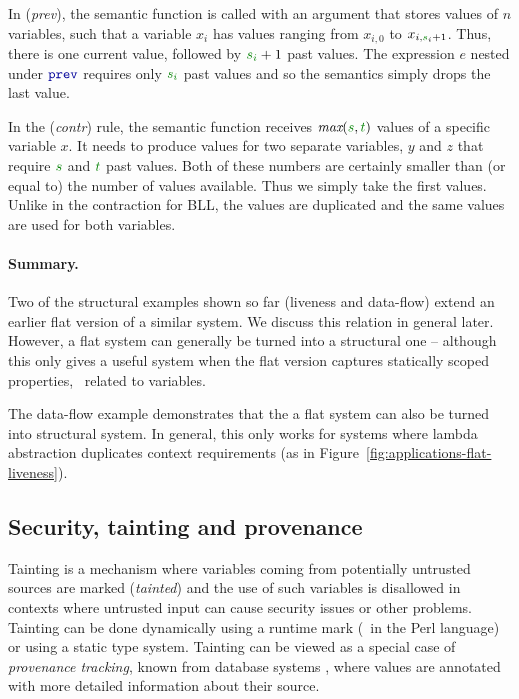 %
In (\emph{prev}), the semantic function is called with an argument that stores values of $n$
variables, such that a variable $x_i$ has values ranging from $x_{i,0}$ to $x_{i,\cclrd{s}_i + 1}$.
Thus, there is one current value, followed by $\cclrd{s_i} + 1$ past values. The expression $e$
nested under $\kvd{prev}$ requires only $\cclrd{s_i}$ past values and so the semantics simply
drops the last value.

In the (\emph{contr}) rule, the semantic function receives $\emph{max}(\cclrd{s}, \cclrd{t})$ values
of a specific variable $x$. It needs to produce values for two separate variables, $y$ and $z$ that
require $\cclrd{s}$ and $\cclrd{t}$ past values. Both of these numbers are certainly smaller than 
(or equal to) the number of values available. Thus we simply take the first values. Unlike in the
contraction for BLL, the values are duplicated and the same values are used for both variables.

\paragraph{Summary.}
Two of the structural examples shown so far (liveness and data-flow) extend an earlier flat 
version of a similar system. We discuss this relation in general later. However, a flat system 
can generally be turned into a structural one -- although this only gives a useful system when
the flat version captures statically scoped properties, \ie~related to variables.

The data-flow example demonstrates that the a flat system can also be turned into structural 
system. In general, this only works for systems where lambda abstraction duplicates context
requirements (as in Figure~\ref{fig:applications-flat-liveness}). 


\subsection{Security, tainting and provenance}
Tainting is a mechanism where variables coming from potentially untrusted sources are marked
(\emph{tainted}) and the use of such variables is disallowed in contexts where untrusted input
can cause security issues or other problems. Tainting can be done dynamically using a runtime mark
(\eg~in the Perl language) or using a static type system. Tainting can be viewed as a special
case of \emph{provenance tracking}, known from database systems \cite{app-provenance-db}, where
values are annotated with more detailed information about their source.

